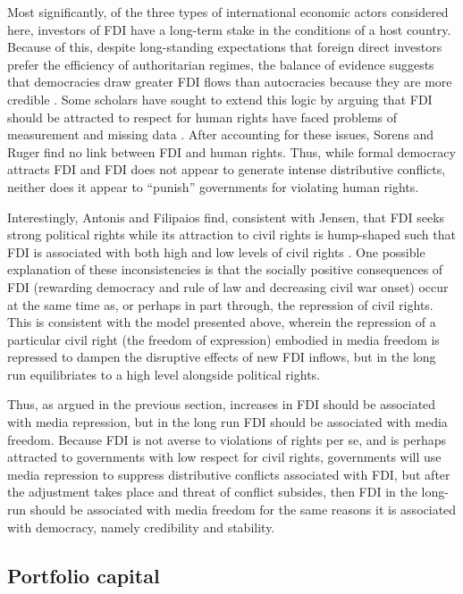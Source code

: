 \documentclass[12pt,a4paper]{article}\usepackage[]{graphicx}\usepackage[]{color}
\begin{document}
Most significantly, of the three types of international economic actors considered here, investors of FDI have a long-term stake in the conditions of a host country. Because of this, despite long-standing expectations that foreign direct investors prefer the efficiency of authoritarian regimes, the balance of evidence suggests that democracies draw greater FDI flows than autocracies because they are more credible \parencite{Jensen:2003to}. Some scholars have sought to extend this logic by arguing that FDI should be attracted to respect for human rights \parencite{Blanton:2007gu} have faced problems of measurement and missing data \parencite{Sorens:2012hc}. After accounting for these issues, Sorens and Ruger find no link between FDI and human rights. Thus, while formal democracy attracts FDI and FDI does not appear to generate intense distributive conflicts, neither does it appear to “punish” governments for violating human rights.

Interestingly, Antonis and Filipaios find, consistent with Jensen, that FDI seeks strong political rights while its attraction to civil rights is hump-shaped such that FDI is associated with both high and low levels of civil rights \parencite*{Adam:2007gn}. One possible explanation of these inconsistencies is that the socially positive consequences of FDI (rewarding democracy and rule of law and decreasing civil war onset) occur at the same time as, or perhaps in part through, the repression of civil rights. This is consistent with the model presented above, wherein the repression of a particular civil right (the freedom of expression) embodied in media freedom is repressed to dampen the disruptive effects of new FDI inflows, but in the long run equilibriates to a high level alongside political rights.

Thus, as argued in the previous section, increases in FDI should be associated with media repression, but in the long run FDI should be associated with media freedom. Because FDI is not averse to violations of rights per se, and is perhaps attracted to governments with low respect for civil rights, governments will use media repression to suppress distributive conflicts associated with FDI, but after the adjustment takes place and threat of conflict subsides, then FDI in the long-run should be associated with media freedom for the same reasons it is associated with democracy, namely credibility and stability.

\subsection{Portfolio capital}
\end{document}
